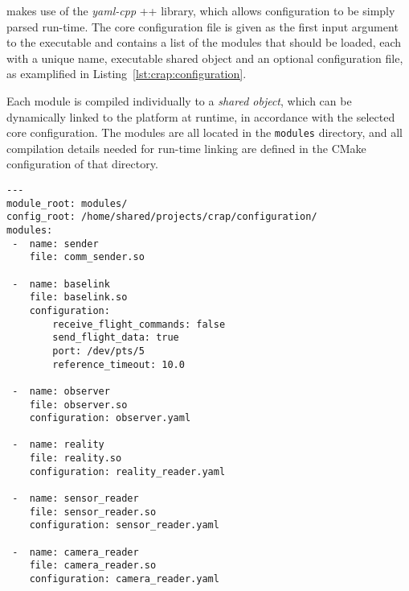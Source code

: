         \crap makes use of the \textit{yaml-cpp} \C++ library, which allows
        configuration to be simply parsed run-time. The core configuration
        file is given as the first input argument to the \crap executable
        and contains a list of the modules that should be loaded, each with
        a unique name, executable shared object and an optional configuration file,
        as examplified in Listing~\ref{lst:crap:configuration}.

        Each module is compiled individually to a \textit{shared object},
        which can be dynamically linked to the \crap platform at runtime, in accordance
        with the selected core configuration.
        The modules are all located in the \texttt{modules} directory,
        and all compilation details needed for run-time linking are defined in the CMake
        configuration of that directory.

        \begin{minipage}{\textwidth}
        \begin{lstlisting}
---
module_root: modules/
config_root: /home/shared/projects/crap/configuration/
modules:
 -  name: sender
    file: comm_sender.so

 -  name: baselink
    file: baselink.so
    configuration:
        receive_flight_commands: false
        send_flight_data: true
        port: /dev/pts/5
        reference_timeout: 10.0

 -  name: observer
    file: observer.so
    configuration: observer.yaml

 -  name: reality
    file: reality.so
    configuration: reality_reader.yaml

 -  name: sensor_reader
    file: sensor_reader.so
    configuration: sensor_reader.yaml

 -  name: camera_reader
    file: camera_reader.so
    configuration: camera_reader.yaml
        \end{lstlisting}
        \end{minipage}

